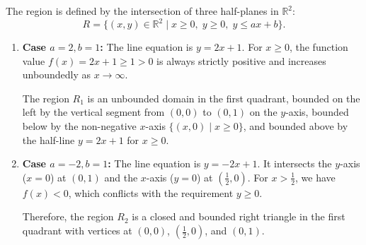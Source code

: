 \begin{exercisesolution*}
\label{sol:affine_map_planar_region}
The region is defined by the intersection of three half-planes in $\mathbb{R}^2$:
\[
R = \bigl\{ (x, y) \in \mathbb{R}^2 \;\big|\; x \ge 0, \; y \ge 0, \; y \le ax + b \bigr\}.
\]
\begin{enumerate}[label=\textbf{(\alph*)}]
    \item \textbf{Case $a = 2, b = 1$:} The line equation is $y = 2x + 1$. For $x \ge 0$, the function value $f(x) = 2x + 1 \ge 1 > 0$ is always strictly positive and increases unboundedly as $x \to \infty$. 
    
    The region $R_1$ is an unbounded domain in the first quadrant, bounded on the left by the vertical segment from $(0,0)$ to $(0,1)$ on the $y$-axis, bounded below by the non-negative $x$-axis $\{ (x, 0) \mid x \ge 0\}$, and bounded above by the half-line $y = 2x + 1$ for $x \ge 0$.

    \item \textbf{Case $a = -2, b = 1$:} The line equation is $y = -2x + 1$. It intersects the $y$-axis ($x = 0$) at $(0, 1)$ and the $x$-axis ($y = 0$) at $(\frac{1}{2}, 0)$. For $x > \frac{1}{2}$, we have $f(x) < 0$, which conflicts with the requirement $y \ge 0$.
    
    Therefore, the region $R_2$ is a closed and bounded right triangle in the first quadrant with vertices at $(0, 0)$, $(\frac{1}{2}, 0)$, and $(0, 1)$.
\end{enumerate}

\begin{center}
\end{center}
\end{exercisesolution*}
